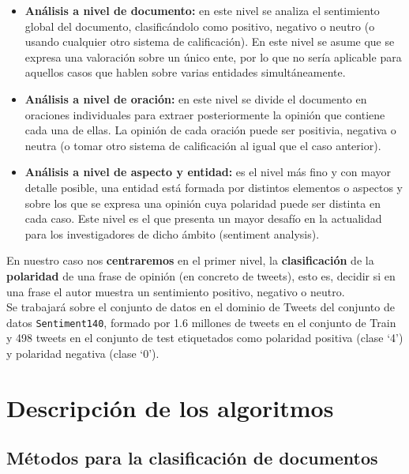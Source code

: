 \documentclass[a4paper,12pt]{report}
\begin{document}
\begin{itemize}
\item \textbf{Análisis a nivel de documento:} en este nivel se analiza el sentimiento global del documento, clasificándolo como positivo, negativo o neutro (o usando cualquier otro sistema de calificación). En este nivel se asume que se expresa una valoración sobre un único ente, por lo que no sería aplicable para aquellos casos que hablen sobre varias entidades simultáneamente.  

\item \textbf{Análisis a nivel de oración:} en este nivel se divide el documento en oraciones individuales para extraer posteriormente la opinión que contiene cada una de ellas. La opinión de cada oración puede ser positivia, negativa o neutra (o tomar otro sistema de calificación al igual que el caso anterior). 

\item \textbf{Análisis a nivel de aspecto y entidad:} es el nivel más fino y con mayor detalle posible, una entidad está formada por distintos elementos o aspectos y sobre los que se expresa una opinión cuya polaridad puede ser distinta en cada caso. Este nivel es el que presenta un mayor desafío en la actualidad para los investigadores de dicho ámbito (sentiment analysis). 

\end{itemize}
\vspace{2mm}

En nuestro caso nos \textbf{centraremos} en el primer nivel,  la \textbf{clasificación} de la \textbf{polaridad} de una frase de opinión (en concreto de tweets), esto es, decidir si en una frase el autor muestra un sentimiento positivo, negativo o neutro.
\vspace{2mm}\\
Se trabajará sobre el
conjunto de datos en el dominio de Tweets del conjunto de datos \texttt{Sentiment140}, formado por
1.6 millones de tweets en el conjunto de Train y 498 tweets en el conjunto de test etiquetados
como polaridad positiva (clase ‘4’) y polaridad negativa (clase ‘0’). 







\chapter{Descripción de los algoritmos}

\section{Métodos para la clasificación de documentos}
\end{document}
